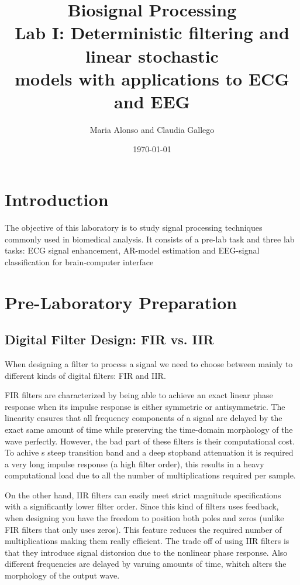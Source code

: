 \documentclass[11pt,a4paper]{article}
\title{\textbf{Biosignal Processing} \\ Lab I: Deterministic filtering and linear stochastic \\ models with applications to ECG and EEG}
\author{Maria Alonso and Claudia Gallego}
\date{\today}
\begin{document}
\maketitle

\section{Introduction}

The objective of this laboratory is to study signal processing techniques commonly used in biomedical analysis. It consists  of a pre-lab task and three lab tasks: ECG signal enhancement, AR-model estimation and EEG-signal classification for brain-computer interface

\section{Pre-Laboratory Preparation}

\subsection{Digital Filter Design: FIR vs. IIR}

When designing a filter to process a signal we need to choose between mainly to different kinds of digital filters: FIR and IIR.

FIR filters are characterized by being able to achieve an exact linear phase response when its impulse response is either symmetric or antisymmetric. The linearity ensures that all frequency components of a signal are delayed by the exact same amount of time while preserving the time-domain morphology of the wave perfectly. However, the bad part of these filters is their computational cost. To achive s steep transition band and a deep stopband attenuation it is required a very long impulse response (a high filter order), this results in a heavy computational load due to all the number of multiplications required per sample. 

On the other hand, IIR filters can easily meet strict magnitude specifications with a significantly lower filter order. Since this kind of filters uses feedback, when designing you have the freedom to position both poles and zeros (unlike FIR filters that only uses zeros).  This feature reduces the required number of multiplications making them really efficient. The trade off of using IIR filters is that they introduce signal distorsion due to the nonlinear phase response. Also different frequencies are delayed by varuing amounts of time, whitch alters the morphology of the output wave. 
\end{document}
